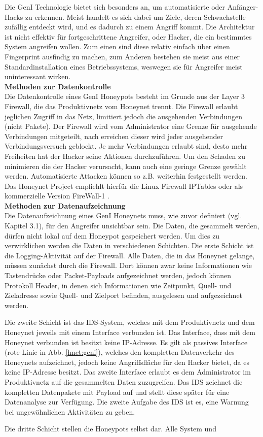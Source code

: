 \noindent Die GenI Technologie bietet sich besonders an, um automatisierte oder Anfänger-Hacks zu erkennen. Meist handelt es sich dabei um Ziele, deren Schwachstelle zufällig entdeckt wird, und es dadurch zu einem Angriff kommt. 
Die Architektur ist nicht effektiv für fortgeschrittene Angreifer, oder Hacker, die ein bestimmtes System angreifen wollen. Zum einen sind diese relativ einfach über einen Fingerprint ausfindig zu machen, zum Anderen bestehen sie meist aus einer Standardinstallation eines Betriebssystems, weswegen sie für Angreifer meist uninteressant wirken\cite{spitzner.2002a}.\\

\noindent\textbf{Methoden zur Datenkontrolle}\\
\noindent Die Datenkontrolle eines GenI Honeypots besteht im Grunde aus der Layer 3 Firewall, die das Produktivnetz vom Honeynet trennt. Die Firewall erlaubt jeglichen Zugriff in das Netz, limitiert jedoch die ausgehenden Verbindungen (nicht Pakete). Der Firewall wird vom Administrator eine Grenze für ausgehende Verbindungen mitgeteilt, nach erreichen dieser wird jeder ausgehender Verbindungsversuch geblockt. Je mehr Verbindungen erlaubt sind, desto mehr Freiheiten hat der Hacker seine Aktionen durchzuführen. Um den Schaden zu minimieren die der Hacker verursacht, kann auch eine geringe Grenze gewählt werden. Automatisierte Attacken können so z.B. weiterhin festgestellt werden. Das Honeynet Project empfiehlt hierfür die Linux Firewall IPTables oder als kommerzielle Version FireWall-1 \cite{spitzner.2002a}.\\

\noindent\textbf{Methoden zur Datenaufzeichnung}\\
\noindent Die Datenaufzeichnung eines GenI Honeynets muss, wie zuvor definiert (vgl. Kapitel 3.1), für den Angreifer unsichtbar sein. Die Daten, die gesammelt werden, dürfen nicht lokal auf dem Honeypot gespeichert werden. Um dies zu verwirklichen werden die Daten in verschiedenen Schichten.
Die erste Schicht ist die Logging-Aktivität auf der Firewall. Alle Daten, die in das Honeynet gelange, müssen zunächst durch die Firewall. Dort können zwar keine Informationen wie Tastendrücke oder Packet-Payloads aufgezeichnet werden, jedoch können Protokoll Header, in denen sich Informationen wie Zeitpunkt, Quell- und Zieladresse sowie Quell- und Zielport befinden, ausgelesen und aufgezeichnet werden\cite{spitzner.2002a}. 

Die zweite Schicht ist das IDS-System, welches mit dem Produktivnetz und dem Honeynet jeweils mit einem Interface verbunden ist. Das Interface, dass mit dem Honeynet verbunden ist besitzt keine IP-Adresse. Es gilt als passives Interface (rote Linie in Abb. \ref{hnet:geni}), welches den kompletten Datenverkehr des Honeynets aufzeichnet, jedoch keine Angriffsfläche für den Hacker bietet, da es keine IP-Adresse besitzt. Das zweite Interface erlaubt es dem Administrator im Produktivnetz auf die gesammelten Daten zuzugreifen. Das IDS zeichnet die kompletten Datenpakete mit Payload auf und stellt diese später für eine Datenanalyse zur Verfügung. Die zweite Aufgabe des IDS ist es, eine Warnung bei ungewöhnlichen Aktivitäten zu geben.

Die dritte Schicht stellen die Honeypots selbst dar. Alle System und 